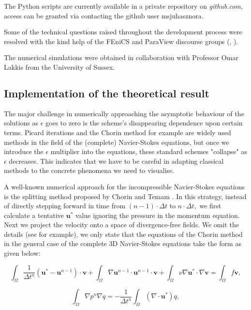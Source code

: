 \documentclass[12pt]{report}
\numberwithin{theorem}{chapter}
\numberwithin{corollary}{chapter}
\numberwithin{lemma}{chapter}
\numberwithin{remark}{chapter}
\numberwithin{definition}{chapter}
\numberwithin{prop}{chapter}
\begin{document}
The Python scripts are currently available in a private repository on \textit{github.com}, access can be granted via contacting the github user msjuhasznora.

Some of the technical questions raised throughout the development process were resolved with the kind help of the FEniCS and ParaView discourse groups (\cite{fenicsgroup}, \cite{paraviewdiscourse}).

The numerical simulations were obtained in collaboration with Professor Omar Lakkis from the University of Sussex.

\subsection{Implementation of the theoretical result}\label{translationfromtheorytonumerics_section}

The major challenge in numerically approaching the asymptotic behaviour of the solutions as $\epsilon$ goes to zero is the scheme's disappearing dependence upon certain terms. Picard iterations and the Chorin method for example are widely used methods in the field of the (complete) Navier-Stokes equations, but once we introduce the $\epsilon$ multiplier into the equations, these standard schemes "collapse" as $\epsilon$ decreases. This indicates that we have to be careful in adapting classical methods to the concrete phenomena we need to visualise.

A well-known numerical approach for the incompressible Navier-Stokes equations is the splitting method proposed by Chorin and Temam \cite{fenicsproject}. In this strategy, instead of directly stepping forward in time from $(n-1) \cdot \Delta t$ to $n \cdot \Delta t,$ we first calculate a tentative $\mathbf{u}^*$ value ignoring the pressure in the momentum equation. Next we project the velocity onto a space of divergence-free fields. We omit the details (see \cite{langtangen2016solving} for example), we only state that the equations of the Chorin method in the general case of the complete 3D Navier-Stokes equations take the form as given below:

$$ \int_\Omega \frac{1}{\Delta t^n} (\mathbf{u}^* - \mathbf{u}^{n-1}) \cdot \mathbf{v} + \int_\Omega \nabla \mathbf{u}^{n-1} \cdot \mathbf{u}^{n-1} \cdot \mathbf{v} + \int_\Omega \nu \nabla \mathbf{u}^* \cdot \nabla \mathbf{v} = \int_\Omega f \mathbf{v},$$

$$ \int_\Omega \nabla p^n \nabla q = - \frac{1}{\Delta t^n} \int_\Omega (\nabla \cdot \mathbf{u}^*) q,$$
\end{document}
